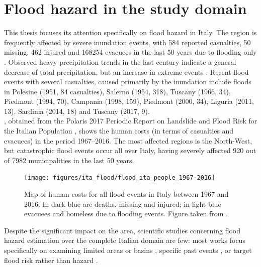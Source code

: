 \section{Flood hazard in the study domain} \label{sec:flood_hazard_ita}
This thesis focuses its attention specifically on flood hazard in Italy. The region is frequently affected by severe inundation events, with 584 reported casualties, 50 missing, 462 injured and 168254 evacuees in the last 50 years due to flooding only \citep[excluding flood-induced landslides, see][]{IRPI2018}. Observed heavy precipitation trends in the last century indicate a general decrease of total precipitation, but an increase in extreme events \citep{Brunetti2004, Brunetti2001, Brunetti2004a}. Recent flood events with several casualties, caused primarily by the inundation include floods in
Polesine (1951, 84 casualties),
Salerno (1954, 318),
Tuscany (1966, 34),
Piedmont (1994, 70),
Campania (1998, 159),
Piedmont (2000, 34),
Liguria (2011, 13),
Sardinia (2014, 18) and
Tuscany (2017, 9).\\
, obtained from the Polaris 2017 Periodic Report on Landslide and Flood Risk for the Italian Population \citep{IRPI2018}, shows the human costs (in terms of casualties and evacuees) in the period 1967--2016. The most affected regions is the  North-West, but catastrophic flood events occur all over Italy, having severely affected 920 out of 7982 municipalities in the last 50 years.

\begin{figure}
    \centering
    \texttt{[image: figures/ita\_flood/flood\_ita\_people\_1967-2016]}
    \decoRule
    \caption[Human costs of floods in Italy, 1967--2016]{Map of human costs for all flood events in Italy between 1967 and 2016. In dark blue are deaths, missing and injured; in light blue evacuees and homeless due to flooding events. Figure taken from \citet[][page 14]{IRPI2018}.}
    \label{fig:flood_events_ita}
\end{figure}

Despite the significant impact on the area, scientific studies concerning flood hazard estimation over the complete Italian domain are few: most works focus specifically on examining limited areas or basins \citep{Sole2008, Marchesini2016, Morelli2014, DiSalvo2017}, specific past events \citep{Marchi2010, Santo2012, Masoero2013, Amadio2013, Norbiato2007}, or target flood risk rather than hazard \citep{Salvati2010, Albano2017, Dottori2016}.

